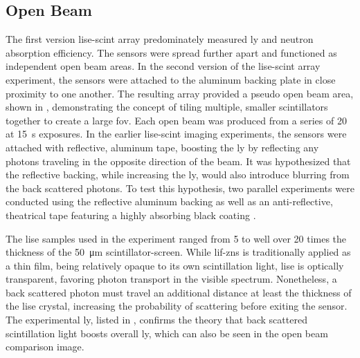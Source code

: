 \documentclass[../../../main.tex]{subfiles}%
\begin{document}
%
    \subsection{Open Beam}%
    \label{sec:chapter-4:scintillator-array:open-beam}%
    The first version \gls{lise-scint} array predominately measured \gls{ly} and neutron absorption efficiency.
    The sensors were spread further apart and functioned as independent open beam areas.
    In the second version of the \gls{lise-scint} array experiment, the sensors were attached to the aluminum backing plate in close proximity to one another.
    The resulting array provided a pseudo open beam area, shown in , demonstrating the concept of tiling multiple, smaller scintillators together to create a large \gls{fov}.
    Each open beam was produced from a series of \SI{20}{\frames} at \SI{15}{\second} exposures.
    In the earlier \gls{lise-scint} imaging experiments, the sensors were attached with reflective, aluminum tape, boosting the \gls{ly} by reflecting any photons traveling in the opposite direction of the beam.
    It was hypothesized that the reflective backing, while increasing the \gls{ly}, would also introduce blurring from the back scattered photons.
    To test this hypothesis, two parallel experiments were conducted using the reflective aluminum backing as well as an anti-reflective, theatrical tape featuring a highly absorbing black coating \cite{Lukosi_2017}. 
    \par%
    The \gls{lise} samples used in the experiment ranged from \num{5} to well over \num{20} times the thickness of the \SI{50}{\micro\meter} \gls{scintillator-screen}.
    While \gls{lif-zns} is traditionally applied as a thin film, being relatively opaque to its own scintillation light, \gls{lise} is optically transparent, favoring photon transport in the visible spectrum.
    Nonetheless, a back scattered photon must travel an additional distance at least the thickness of the \gls{lise} crystal, increasing the probability of scattering before exiting the sensor.
    The experimental \gls{ly}, listed in , confirms the theory that back scattered scintillation light boosts overall \gls{ly}, which can also be seen in the open beam comparison image.
\end{document}
